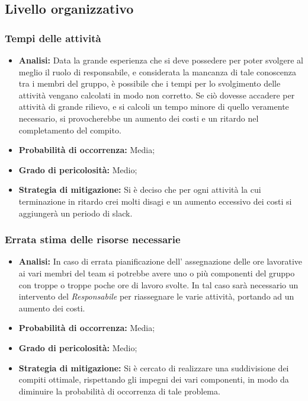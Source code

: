 \subsection{Livello organizzativo}
\subsubsection{Tempi delle attività}
	\begin{itemize}
	\item \textbf{Analisi: }Data la grande esperienza che si deve possedere per poter svolgere al meglio il ruolo di responsabile, e considerata la mancanza di tale conoscenza tra i membri del gruppo, è possibile che i tempi per lo svolgimento delle attività vengano calcolati in modo non corretto. Se ciò dovesse accadere per attività di grande rilievo, e si calcoli un tempo minore di quello veramente necessario, si provocherebbe un aumento dei costi e un ritardo nel completamento del compito.
	\item \textbf{Probabilità di occorrenza:} Media;
	\item \textbf{Grado di pericolosità:} Medio;
	\item \textbf{Strategia di mitigazione: }Si è deciso che per ogni attività la cui terminazione in ritardo crei molti disagi e un aumento eccessivo dei costi si aggiungerà un periodo di slack.
	\end{itemize}
\subsubsection{Errata stima delle risorse necessarie}
	\begin{itemize}
	\item \textbf{Analisi: }In caso di errata pianificazione dell' assegnazione delle ore lavorative ai vari membri del team si potrebbe avere uno o più componenti del gruppo con troppe o troppe poche ore di lavoro svolte. In tal caso sarà necessario un intervento del \textit{Responsabile} per riassegnare le varie attività, portando ad un aumento dei costi.
	\item \textbf{Probabilità di occorrenza:} Media;
	\item \textbf{Grado di pericolosità:} Medio;
	\item \textbf{Strategia di mitigazione: }Si è cercato di realizzare una suddivisione dei compiti ottimale, rispettando gli impegni dei vari componenti, in modo da diminuire la probabilità di occorrenza di tale problema.
	\end{itemize}
